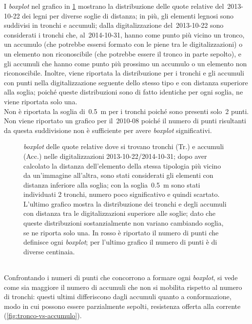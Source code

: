 I \emph{boxplot} nel grafico in \cref{graph:legno-wj-dem-detrended-distanza} mostrano la distribuzione delle quote relative del~2013-10-22 dei legni per diverse soglie di distanza; in più, gli elementi legnosi sono suddivisi in tronchi e accumuli; dalla digitalizzazione del~2013-10-22 sono considerati i tronchi che, al~2014-10-31, hanno come punto più vicino un tronco, un accumulo (che potrebbe essersi formato con le piene tra le digitalizzazioni) o un elemento non riconoscibile (che potrebbe essere il tronco in parte sepolto), e gli accumuli che hanno come punto più prossimo un accumulo o un elemento non riconoscibile.
Inoltre, viene riportata la distribuzione per i tronchi e gli accumuli con punti nella digitalizzazione seguente dello stesso tipo e con distanza superiore alla soglia; poiché queste distribuzioni sono di fatto identiche per ogni soglia, ne viene riportata solo una.
\\
Non è riportata la soglia di~\SI{0.5}{\m} per i tronchi poiché sono presenti solo~2 punti.
Non viene riportato un grafico per il~2010-08 poiché il numero di punti risultanti da questa suddivisione non è sufficiente per avere \emph{boxplot} significativi.
%
\begin{figure}
	\centering
	
	\caption[\emph{boxplot} delle quote relative dei tronchi e degli accumuli non mobilitati e mobilitati]{\emph{boxplot} delle quote relative dove si trovano tronchi (Tr.) e accumuli (Acc.) nelle digitalizzazioni 2013-10-22/2014-10-31; dopo aver calcolato la distanza dell'elemento della stessa tipologia più vicino da un'immagine all'altra, sono stati considerati gli elementi con distanza inferiore alla soglia; con la soglia~\SI{0.5}{\m} sono stati individuati \num{2} tronchi, numero poco significativo e quindi scartato.
	L'ultimo grafico mostra la distribuzione dei tronchi e degli accumuli con distanza tra le digitalizzazioni superiore alle soglie; dato che queste distribuzioni sostanzialmente non variano cambiando soglia, se ne riporta solo una.
	In rosso è riportato il numero di punti che definisce ogni \emph{boxplot}; per l'ultimo grafico il numero di punti è di diverse centinaia.}
	\label{graph:legno-wj-dem-detrended-distanza}
\end{figure}
%
\\
Confrontando i numeri di punti che concorrono a formare ogni \emph{boxplot}, si vede come sia maggiore il numero di accumuli che non si mobilita rispetto al numero di tronchi: questi ultimi differiscono dagli accumuli quanto a conformazione, modo in cui possono essere parzialmente sepolti, resistenza offerta alla corrente (\cref{fig:tronco-vs-accumulo}).
